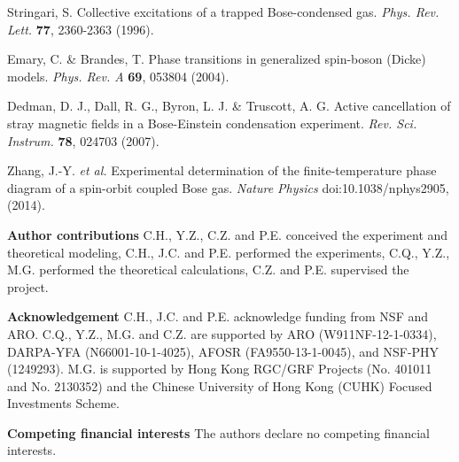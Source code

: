 \documentclass[prl,aps,twocolumn,floatfix]{revtex4}
\begin{document}
\begin{thebibliography}{99}
 Stringari, S. Collective excitations of a trapped
Bose-condensed gas. \textit{Phys. Rev. Lett.} \textbf{77}, 2360-2363 (1996).

 Emary, C. \& Brandes, T. Phase transitions in generalized
spin-boson (Dicke) models. \textit{Phys. Rev. A} \textbf{69}, 053804 (2004).

 Dedman, D. J., Dall, R. G., Byron, L. J. \& Truscott, A.
G. Active cancellation of stray magnetic fields in a Bose-Einstein
condensation experiment. \textit{Rev. Sci. Instrum.} \textbf{78}, 024703
(2007).

 Zhang, J.-Y. \textit{et al.} Experimental determination of
the finite-temperature phase diagram of a spin-orbit coupled Bose gas.
\textit{Nature Physics} doi:10.1038/nphys2905, (2014).
\end{thebibliography}

\textbf{Author contributions} C.H., Y.Z., C.Z. and P.E. conceived the
experiment and theoretical modeling, C.H., J.C. and P.E. performed the
experiments, C.Q., Y.Z., M.G. performed the theoretical calculations, C.Z.
and P.E. supervised the project.

\textbf{Acknowledgement} C.H., J.C. and P.E. acknowledge funding from NSF and
ARO. C.Q., Y.Z., M.G. and C.Z. are supported by ARO (W911NF-12-1-0334),
DARPA-YFA (N66001-10-1-4025), AFOSR (FA9550-13-1-0045), and NSF-PHY
(1249293). M.G. is supported by Hong Kong RGC/GRF Projects (No. 401011 and
No. 2130352) and the Chinese University of Hong Kong (CUHK) Focused
Investments Scheme.

\textbf{Competing financial interests} The authors declare no competing
financial interests.
\end{document}
